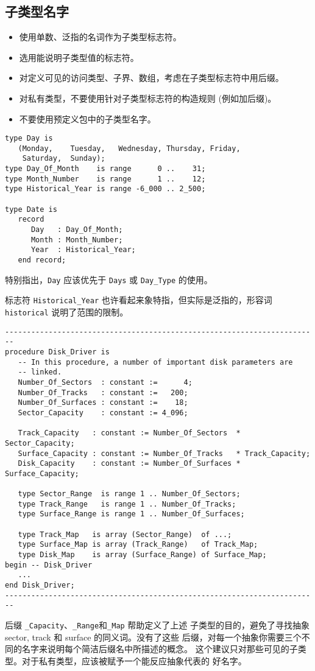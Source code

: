\subsection{子类型名字}
\begin{itemize}
    \item 使用单数、泛指的名词作为子类型标志符。
    \item 选用能说明子类型值的标志符。
    \item 对定义可见的访问类型、子界、数组，考虑在子类型标志符中用后缀。
    \item 对私有类型，不要使用针对子类型标志符的构造规则 (例如加后缀)。
    \item 不要使用预定义包中的子类型名字。
\end{itemize}

\begin{blockindent}
\begin{lstlisting}
type Day is
   (Monday,    Tuesday,   Wednesday, Thursday, Friday,
    Saturday,  Sunday);
type Day_Of_Month    is range      0 ..    31;
type Month_Number    is range      1 ..    12;
type Historical_Year is range -6_000 .. 2_500;

type Date is
   record
      Day   : Day_Of_Month;
      Month : Month_Number;
      Year  : Historical_Year;
   end record;
\end{lstlisting}
特别指出，\texttt{Day} 应该优先于 \texttt{Days} 或 \texttt{Day\_Type} 的使用。

标志符 \texttt{Historical\_Year} 也许看起来象特指，但实际是泛指的，形容词
\texttt{historical} 说明了范围的限制。
\begin{lstlisting}
------------------------------------------------------------------------
procedure Disk_Driver is
   -- In this procedure, a number of important disk parameters are
   -- linked.
   Number_Of_Sectors  : constant :=      4;
   Number_Of_Tracks   : constant :=   200;
   Number_Of_Surfaces : constant :=    18;
   Sector_Capacity    : constant := 4_096;

   Track_Capacity   : constant := Number_Of_Sectors  * Sector_Capacity;
   Surface_Capacity : constant := Number_Of_Tracks   * Track_Capacity;
   Disk_Capacity    : constant := Number_Of_Surfaces * Surface_Capacity;

   type Sector_Range  is range 1 .. Number_Of_Sectors;
   type Track_Range   is range 1 .. Number_Of_Tracks;
   type Surface_Range is range 1 .. Number_Of_Surfaces;

   type Track_Map   is array (Sector_Range)  of ...;
   type Surface_Map is array (Track_Range)   of Track_Map;
   type Disk_Map    is array (Surface_Range) of Surface_Map;
begin -- Disk_Driver
   ...
end Disk_Driver;
------------------------------------------------------------------------
\end{lstlisting}
后缀 \texttt{\_Capacity}、\texttt{\_Range}和\texttt{\_Map} 帮助定义了上述
子类型的目的，避免了寻找抽象 sector, track 和 surface 的同义词。没有了这些
后缀，对每一个抽象你需要三个不同的名字来说明每个简洁后缀名中所描述的概念。
这个建议只对那些可见的子类型。对于私有类型，应该被赋予一个能反应抽象代表的
好名字。
\end{blockindent}

